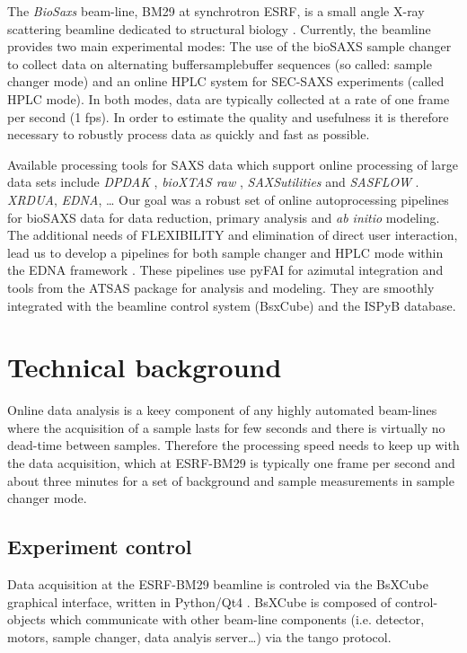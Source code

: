 \documentclass[preprint,pdf]{iucr}              %
\begin{document}
The \textit{BioSaxs} beam-line, BM29 at synchrotron ESRF, is a small angle X-ray
scattering beamline dedicated to structural biology \cite{BM29paper}.
Currently, the beamline provides two main experimental modes: The use of the
bioSAXS sample changer to collect data on alternating buffer\/sample\/buffer
sequences (so called: sample changer mode) and an online HPLC system for
SEC-SAXS experiments (called HPLC mode).
In both modes, data are typically collected at a rate of one frame per second
(1 fps).
In order to estimate the quality and usefulness it is therefore necessary to
robustly process data as quickly and fast as possible.

Available processing tools for SAXS data which support online processing of
large data sets include \textit{DPDAK} \cite{DPDAK}, \textit{bioXTAS raw}
\cite{BioXTASraw}, \textit{SAXSutilities} \cite{SAXSUtilities} and
\textit{SASFLOW} \cite{X33P,P12}.  \textit{XRDUA}, \textit{EDNA}, \ldots
Our goal was a robust set of online autoprocessing pipelines for bioSAXS data
for data reduction, primary analysis and \textit{ab initio} modeling.
The additional needs of FLEXIBILITY and elimination of direct user interaction,
lead us to develop a pipelines for both sample changer and HPLC mode within the
EDNA framework \cite{edna}.
These pipelines use pyFAI for azimutal integration \cite{pyFAI} and tools from
the ATSAS package \cite{ATSAS1, ATSAS2} for analysis and modeling. They are
smoothly integrated with the beamline control system (BsxCube) and the ISPyB
database.

\section{Technical background}

Online data analysis is a keey component of any highly automated beam-lines
where the acquisition of a sample lasts for few seconds and there is
virtually no dead-time between samples.
Therefore the processing speed needs to keep up with the data acquisition, which
at ESRF-BM29 is typically one frame per second and about three minutes for a set
of background and sample measurements in sample changer mode.


\subsection{Experiment control}
Data acquisition at the ESRF-BM29 beamline is controled via the BsXCube
graphical interface, written in Python/Qt4 \cite{pyqt}.
BsXCube is composed of control-objects which communicate with other beam-line
components (i.e. detector, motors, sample changer, data analyis server\ldots)
via the tango protocol\cite{tango}.
\end{document}

